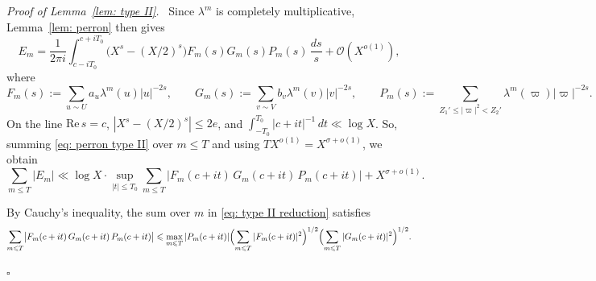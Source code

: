 \documentclass{article}
\numberwithin{equation}{section}
\newenvironment{proof}[1][Proof]{\par\medskip\noindent\textit{#1.}\ }{\hfill$\square$\par\medskip}
\newcommand{\Le}{\leqslant}
\begin{document}
\begin{proof}[Proof of Lemma~\ref{lem: type II}]
Since $\lambda^m$ is completely multiplicative, Lemma~\ref{lem: perron} then gives
\begin{equation}
\label{eq: perron type II}
E_m = \frac{1}{2\pi i} \int_{c - iT_0}^{c + iT_0} \bigl(X^s - (X/2)^s\bigr) F_m(s) G_m(s) P_m(s)\, \frac{ds}{s} + \mathcal{O}(X^{o(1)}),
\end{equation}
where
\begin{equation*}
F_m(s) := \sum_{u \sim U} a_u \lambda^m(u) |u|^{-2s}, \qquad G_m(s) := \sum_{v \sim V} b_v \lambda^m(v) |v|^{-2s}, \qquad P_m(s) := \sum_{Z_1' \Le |\varpi|^2 < Z_2'} \lambda^m(\varpi) |\varpi|^{-2s}.
\end{equation*}
On the line $\mathrm{Re}\, s = c$, $|X^s - (X/2)^s| \Le 2e$, and $\int_{-T_0}^{T_0} |c + it|^{-1}\, dt \ll \log X$. So, summing \eqref{eq: perron type II} over $m \Le T$ and using $T X^{o(1)} = X^{\sigma + o(1)}$, we obtain
\begin{equation}
\label{eq: type II reduction}
\sum_{m \Le T} |E_m| \ll \log X \cdot \sup_{|t| \Le T_0} \sum_{m \Le T} \bigl| F_m(c + it)\, G_m(c + it)\, P_m(c + it) \bigr| + X^{\sigma + o(1)}.
\end{equation}

By Cauchy's inequality, the sum over $m$ in \eqref{eq: type II reduction} satisfies
\begin{equation*}
\sum_{m \Le T} \bigl| F_m(c + it)\, G_m(c + it)\, P_m(c + it) \bigr| \Le \max_{m \Le T} |P_m(c + it)| \Bigl( \sum_{m \Le T} |F_m(c + it)|^2 \Bigr)^{1/2} \Bigl( \sum_{m \Le T} |G_m(c + it)|^2 \Bigr)^{1/2}.
\end{equation*}


\end{proof}
\end{document}
